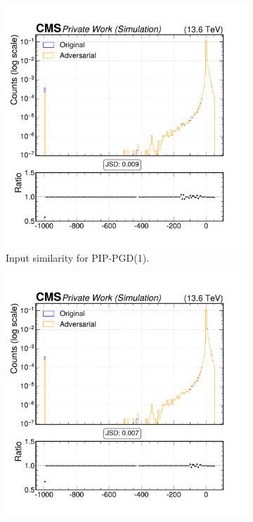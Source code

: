 \begin{figure}[htbp]
  \centering
  \begin{subfigure}[t]{0.32\textwidth}
    \includegraphics[width=\linewidth]{media/output/features/compare/combined_it_1/cmp_global_features_TagVarCSV_trackSip3dSigAboveCharm.pdf}
    \caption*{Input similarity for PIP-PGD(1).}
  \end{subfigure}\hfill
  \begin{subfigure}[t]{0.32\textwidth}
    \includegraphics[width=\linewidth]{media/output/features/compare/combined_it_2/cmp_global_features_TagVarCSV_trackSip3dSigAboveCharm.pdf}

\end{subfigure}
\end{figure}
